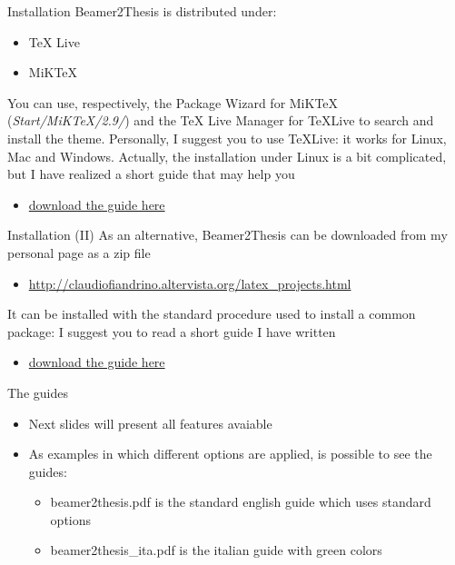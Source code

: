 \begin{tframe}{Installation}
Beamer2Thesis is distributed under:
\begin{itemize}
\item TeX Live
\item MiKTeX
\end{itemize}
You can use, respectively, the Package Wizard for MiK\TeX\, (\emph{Start/MiKTeX/2.9/}) and the TeX Live Manager for \TeX Live to search and install the theme.
Personally, I suggest you to use \TeX Live: it works for Linux, Mac and Windows. Actually, the installation under Linux is a bit complicated, but I have realized a short guide that may help you
\begin{itemize}
\item \href{http://claudiofiandrino.altervista.org/LaTeX/texlive_on_ubuntu_guide.pdf}{download the guide here}
\end{itemize}

\end{tframe}

\begin{tframe}{Installation (II)}
\label{slide-guide-installation}
As an alternative, Beamer2Thesis can be downloaded from my personal page as a zip file
\begin{itemize}
\item \href{http://claudiofiandrino.altervista.org/latex\_projects.html}{http://claudiofiandrino.altervista.org/latex\_projects.html}
\end{itemize}
It can be installed with the standard procedure used to install a common package: I suggest you to read a short guide I have written
\begin{itemize}
\item \href{http://claudiofiandrino.altervista.org/LaTeX/package_installation.pdf}{download the guide here}
\end{itemize}
\end{tframe}

\begin{tframe}{The guides}
\begin{itemize}
\item Next slides will present all features avaiable
\item As examples in which different options are applied, is possible to see the guides:
\begin{itemize}
\item beamer2thesis.pdf is the standard english guide which uses standard options
\item beamer2thesis\_ita.pdf is the italian guide with green colors
\end{itemize}
\end{itemize}
\end{tframe}

